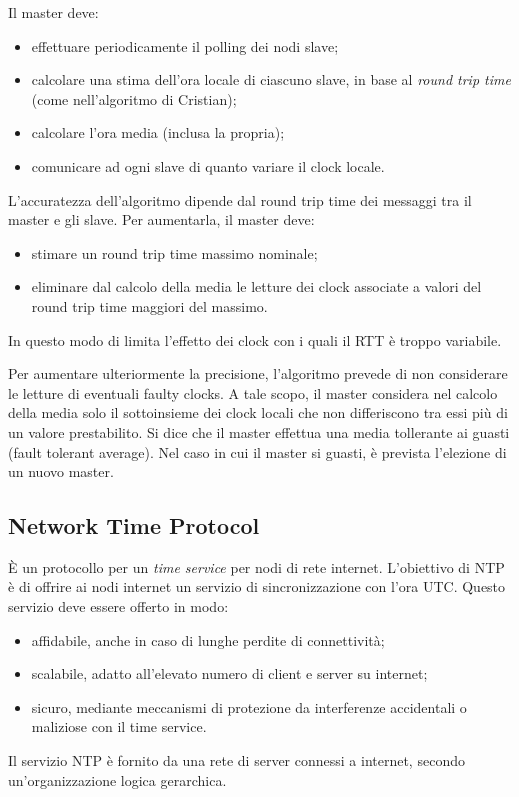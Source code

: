 Il master deve:
\begin{itemize}
    \item effettuare periodicamente il polling dei nodi slave;
    \item calcolare una stima dell'ora locale di ciascuno slave, in base al \textit{round trip time} (come nell'algoritmo di Cristian);
    \item calcolare l'ora media (inclusa la propria);
    \item comunicare ad ogni slave di quanto variare il clock locale.
\end{itemize}
L'accuratezza dell'algoritmo dipende dal round trip time dei messaggi tra il master e gli slave. Per aumentarla, il master deve:
\begin{itemize}
    \item stimare un round trip time massimo nominale;
    \item eliminare dal calcolo della media le letture dei clock associate a valori del round trip time maggiori del massimo.
\end{itemize}
In questo modo di limita l'effetto dei clock con i quali il RTT è troppo variabile.

Per aumentare ulteriormente la precisione, l'algoritmo prevede di non considerare le letture di eventuali faulty clocks. A tale scopo, il master considera nel calcolo della media solo il sottoinsieme dei clock locali che non differiscono tra essi più di un valore prestabilito. Si dice che il master effettua una media tollerante ai guasti (fault tolerant average). Nel caso in cui il master si guasti, è prevista l'elezione di un nuovo master.

\subsection{Network Time Protocol}
È un protocollo per un \textit{time service} per nodi di rete internet. L'obiettivo di NTP è di offrire ai nodi internet un servizio di sincronizzazione con l'ora UTC. Questo servizio deve essere offerto in modo:
\begin{itemize}
    \item affidabile, anche in caso di lunghe perdite di connettività;
    \item scalabile, adatto all'elevato numero di client e server su internet;
    \item sicuro, mediante meccanismi di protezione da interferenze accidentali o maliziose con il time service.
\end{itemize}
Il servizio NTP è fornito da una rete di server connessi a internet, secondo un'organizzazione logica gerarchica. 

